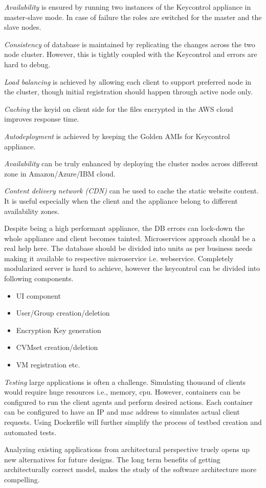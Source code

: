 \documentclass[conference]{IEEEtran}
\begin{document}
\textit{Availability} is ensured by running two instances of the Keycontrol appliance in master-slave mode.
In case of failure the roles are switched for the master and the slave nodes. 
\par\textit{Consistency} of database is maintained by replicating the changes across the two node cluster. However, this is tightly coupled with the Keycontrol and errors are hard to debug. 
\par\textit{Load balancing} is achieved by allowing each client to support preferred node in the cluster, though initial registration should happen through active node only.
\par\textit{Caching} the keyid on client side for the files encrypted in the AWS cloud improves response time.
\par\textit{Autodeployment} is achieved by keeping the Golden AMIs for Keycontrol appliance.
\par\textit{Availability} can be truly enhanced by deploying the cluster nodes across different zone in Amazon/Azure/IBM cloud.
\par\textit{Content delivery network (CDN)} can be used to cache the static website content. It is useful especially when the client and the appliance belong to different availability zones.
\par Despite being a high performant appliance, the DB errors can lock-down the whole appliance and client becomes tainted. Microservices approach should be a real help here. The database should be divided into units as per business needs making it available to respective microservice i.e. webservice. Completely modularized server is hard to achieve, however the keycontrol can be divided into following components.
\begin{itemize}
\item UI component
\item User/Group creation/deletion
\item Encryption Key generation
\item CVMset creation/deletion
\item VM registration etc.
\end{itemize}

\par\textit{Testing} large applications is often a challenge. Simulating thousand of clients would require huge resources i.e., memory, cpu. However, containers can be configured to run the client agents and perform desired actions. Each container can be configured to have an IP and mac address to simulates actual client requests. Using Dockerfile will further simplify the process of testbed creation and automated tests.
\par Analyzing existing applications from architectural perspective truely opens up new alternatives for future designs. The long term benefits of getting architecturally correct model, makes the study of the software architecture more compelling.
\end{document}
